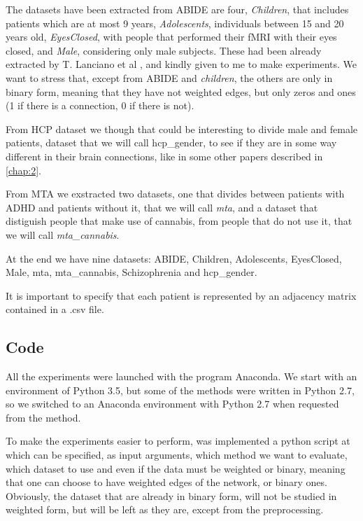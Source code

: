 The datasets have been extracted from ABIDE are four, \textit{Children}, that includes patients which are at most 9 years, \textit{Adolescents}, individuals between 15 and 20 years old, \textit{EyesClosed}, with people that performed their fMRI with their eyes closed, and \textit{Male}, considering only male subjects. These had been already extracted by T. Lanciano et al \cite{lanciano2020cs}, and kindly given to me to make experiments. We want to stress that, except from ABIDE and \textit{children}, the others are only in binary form, meaning that they have not weighted edges, but only zeros and ones (1 if there is a connection, 0 if there is not).
\vspace{0.5cm}

From HCP dataset we though that could be interesting to divide male and female patients, dataset that we will call hcp\_gender, to see if they are in some way different in their brain connections, like in some other papers described in \ref{chap:2}. 
\vspace{0.5cm}

From MTA we exstracted two datasets, one that divides between patients with ADHD and patients without it, that we will call \textit{mta}, and a dataset that distiguish people that make use of cannabis, from people that do not use it, that we will call \textit{mta\_cannabis}.
\vspace{0.5cm}

At the end we have nine datasets: ABIDE, Children, Adolescents, EyesClosed, Male, mta, mta\_cannabis, Schizophrenia and hcp\_gender. 
\vspace{0.5cm}

It is important to specify that each patient is represented by an adjacency matrix contained in a .csv file.

\subsection{Code}
All the experiments were launched with the program Anaconda. We start with an environment of Python 3.5, but some of the methods were written in Python 2.7, so we switched to an Anaconda environment with Python 2.7 when requested from the method.
\vspace{0.5cm}

To make the experiments easier to perform, was implemented a python script at which can be specified, as input arguments, which method we want to evaluate, which dataset to use and even if the data must be weighted or binary, meaning that one can choose to have weighted edges of the network, or binary ones. Obviously, the dataset that are already in binary form, will not be studied in weighted form, but will be left as they are, except from the preprocessing.
\vspace{0.5cm}

